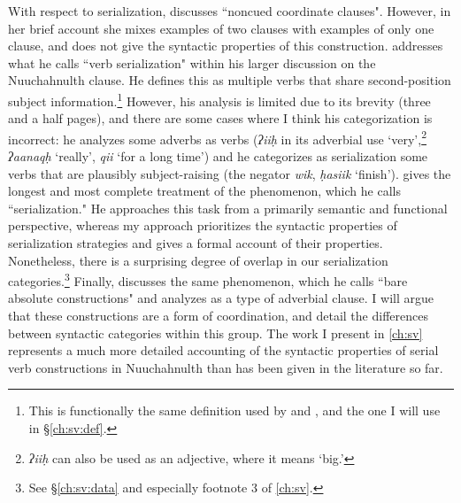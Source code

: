 With respect to serialization, \citet[p.~153--154]{rose1981} discusses ``noncued coordinate clauses". However, in her brief account she mixes examples of two clauses with examples of only one clause, and does not give the syntactic properties of this construction. %
\citet[p.~248--252]{jacobsen1993} addresses what he calls ``verb serialization" within his larger discussion on the Nuuchahnulth clause. He defines this as multiple verbs that share second-position subject information.\footnote{This is functionally the same definition used by \citeauthor{nakayama2001} and \citeauthor{davidson2002}, and the one I will use in \S\ref{ch:sv:def}.} However, his analysis is limited due to its brevity (three and a half pages), and there are some cases where I think his categorization is incorrect: he analyzes some adverbs as verbs (\textit{ʔiiḥ} in its adverbial use `very',\footnote{\textit{ʔiiḥ} can also be used as an adjective, where it means `big.'} \textit{ʔaanaqḥ} `really', \textit{qii} `for a long time') and he categorizes as serialization some verbs that are plausibly subject-raising (the negator \textit{wik}, \textit{ḥasiik} `finish'). \citet[p.~102--109]{nakayama2001} gives the longest and most complete treatment of the phenomenon, which he calls ``serialization." He approaches this task from a primarily semantic and functional perspective, whereas my approach prioritizes the syntactic properties of serialization strategies and gives a formal account of their properties. Nonetheless, there is a surprising degree of overlap in our serialization categories.\footnote{See \S\ref{ch:sv:data} and especially footnote 3 of \cref{ch:sv}.} Finally, \citet[p.~149--152]{davidson2002} discusses the same phenomenon, which he calls ``bare absolute constructions" and analyzes as a type of adverbial clause. I will argue that these constructions are a form of coordination, and detail the differences between syntactic categories within this group. The work I present in \cref{ch:sv} represents a much more detailed accounting of the syntactic properties of serial verb constructions in Nuuchahnulth than has been given in the literature so far.

